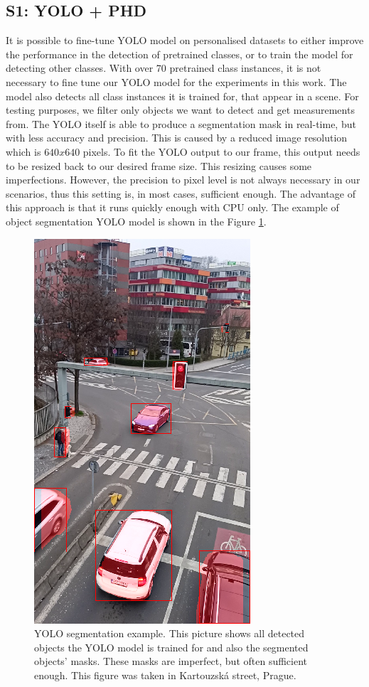 \subsection{S1: YOLO + PHD}
It is possible to fine-tune YOLO model on personalised datasets to either improve the performance in the
detection of
pretrained classes, or to train the model for detecting other classes. With over 70 pretrained class instances, it is
not necessary to fine tune our YOLO model for the experiments in this work. The model also detects all class
instances it is trained for, that appear in a scene. For testing purposes, we filter only objects we want to detect
and get
measurements from. The YOLO itself is able to produce a segmentation mask in real-time, but with less
accuracy
and
precision. This is caused by a reduced image resolution which is $640x640$ pixels. To fit the YOLO output
to our
frame,
this output needs to be resized back to our desired frame size. This resizing causes some imperfections. However, the
precision
to pixel level is not always necessary in our scenarios, thus this setting is, in most cases, sufficient
enough. The advantage of this approach is that it runs quickly enough with CPU only. The example of
object segmentation YOLO model is shown in the Figure \ref{fig:yolo_seg}.
\begin{figure}[h]
  \centering
  \includegraphics[width=0.35\linewidth]{text/chapter_04/imgs/YOLO_screenshot_2}
  \caption{YOLO segmentation example. This picture shows all detected objects the YOLO model is trained for and also
  the segmented objects' masks. These masks are imperfect, but often sufficient enough. This figure was taken in
  Kartouzská street, Prague.}
  \label{fig:yolo_seg}
\end{figure}

